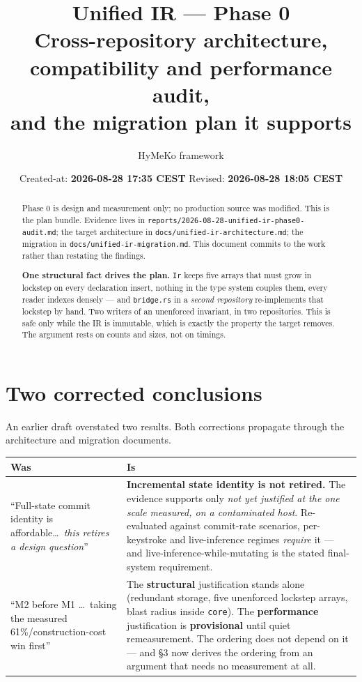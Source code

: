 \documentclass[11pt,a4paper]{article}
\title{Unified IR --- Phase 0\\[2pt]
       \large Cross-repository architecture, compatibility and performance audit,\\
       and the migration plan it supports}
\author{HyMeKo framework}
\date{Created-at: \textbf{2026-08-28 17:35 CEST} \quad Revised: \textbf{2026-08-28 18:05 CEST}}
\newcommand{\code}[1]{\texttt{#1}}
\begin{document}
\maketitle

\begin{abstract}
\noindent
Phase 0 is design and measurement only; no production source was modified.
This is the plan bundle. Evidence lives in
\code{reports/2026-08-28-unified-ir-phase0-audit.md}; the target architecture
in \code{docs/unified-ir-architecture.md}; the migration in
\code{docs/unified-ir-migration.md}. This document commits to the work rather
than restating the findings.

\medskip
\noindent
\textbf{One structural fact drives the plan.} \code{Ir} keeps five arrays that
must grow in lockstep on every declaration insert, nothing in the type system
couples them, every reader indexes densely --- and \code{bridge.rs} in a
\emph{second repository} re-implements that lockstep by hand. Two writers of an
unenforced invariant, in two repositories. This is safe only while the IR is
immutable, which is exactly the property the target removes. The argument rests
on counts and sizes, not on timings.
\end{abstract}

\section{Two corrected conclusions}

An earlier draft overstated two results. Both corrections propagate through the
architecture and migration documents.

\begin{longtable}{@{}p{}p{}@{}}
\toprule
\textbf{Was} & \textbf{Is} \\
\midrule
\endhead
``Full-state commit identity is affordable\ldots\ \emph{this retires a design
question}'' & \textbf{Incremental state identity is not retired.} The evidence
supports only \emph{not yet justified at the one scale measured, on a
contaminated host}. Re-evaluated against commit-rate scenarios, per-keystroke
and live-inference regimes \emph{require} it --- and live-inference-while-mutating
is the stated final-system requirement. \\[4pt]
``M2 before M1 \ldots\ taking the measured 61\%/construction-cost win first'' &
The \textbf{structural} justification stands alone (redundant storage, five
unenforced lockstep arrays, blast radius inside \code{core}). The
\textbf{performance} justification is \textbf{provisional} until quiet
remeasurement. The ordering does not depend on it --- and \S3 now derives the
ordering from an argument that needs no measurement at all. \\
\bottomrule
\end{longtable}
\end{document}
